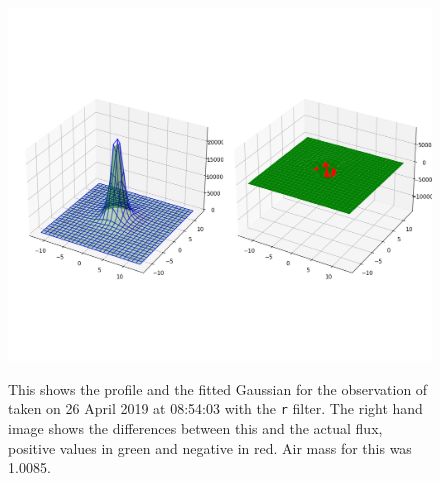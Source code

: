 \begin{figure}[!htbp]
\begin{center}
\includegraphics[scale=0.40]{images/goodfit.png} \\
\vspace{-.5cm}
\end{center}
\caption{This shows the profile and the fitted
Gaussian for the observation of {\ross} taken on 26
April 2019 at 08:54:03 with the \texttt{r} filter. The right
hand image shows the differences between this and
the actual flux, positive values in green and
negative in red. Air mass for this was 1.0085.}
\protect\label{fig:goodfit}
\end{figure}

